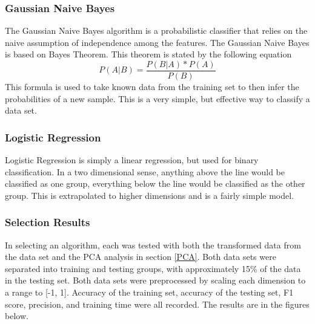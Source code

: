 \documentclass{article}
\begin{document}
\subsubsection{Gaussian Naive Bayes}
\par
The Gaussian Naive Bayes algorithm is a probabilistic classifier that relies on the naive assumption of independence among the features. The Gaussian Naive Bayes is based on Bayes Theorem. This theorem is stated by the following equation
$$P(A|B) = \frac{P(B|A)*P(A)}{P(B)}$$
This formula is used to take known data from the training set to then infer the probabilities of a new sample. This is a very simple, but effective way to classify a data set.

\subsubsection{Logistic Regression}
\par
Logistic Regression is simply a linear regression, but used for binary classification. In a two dimensional sense, anything above the line would be classified as one group, everything below the line would be classified as the other group. This is extrapolated to higher dimensions and is a fairly simple model.

\subsubsection{Selection Results}
\par
In selecting an algorithm, each was tested with both the transformed data from the data set and the PCA analysis in section \ref{PCA}. Both data sets were separated into training and testing groups, with approximately 15\% of the data in the testing set. Both data sets were preprocessed by scaling each dimension to a range to [-1, 1]. Accuracy of the training set, accuracy of the testing set, F1 score, precision, and training time were all recorded. The results are in the figures below. %
\end{document}
